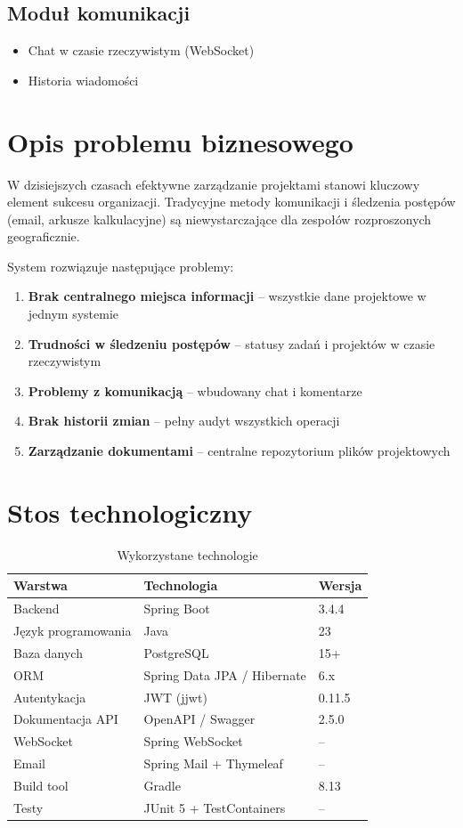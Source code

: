 \documentclass[12pt,a4paper]{report}
\begin{document}
\subsection{Moduł komunikacji}
\begin{itemize}
    \item Chat w czasie rzeczywistym (WebSocket)
    \item Historia wiadomości
\end{itemize}

\section{Opis problemu biznesowego}

W dzisiejszych czasach efektywne zarządzanie projektami stanowi kluczowy element sukcesu organizacji. Tradycyjne metody komunikacji i śledzenia postępów (email, arkusze kalkulacyjne) są niewystarczające dla zespołów rozproszonych geograficznie.

System rozwiązuje następujące problemy:
\begin{enumerate}
    \item \textbf{Brak centralnego miejsca informacji} -- wszystkie dane projektowe w jednym systemie
    \item \textbf{Trudności w śledzeniu postępów} -- statusy zadań i projektów w czasie rzeczywistym
    \item \textbf{Problemy z komunikacją} -- wbudowany chat i komentarze
    \item \textbf{Brak historii zmian} -- pełny audyt wszystkich operacji
    \item \textbf{Zarządzanie dokumentami} -- centralne repozytorium plików projektowych
\end{enumerate}

\section{Stos technologiczny}

\begin{table}[H]
\centering
\caption{Wykorzystane technologie}
\begin{tabular}{|l|l|l|}
\hline
\textbf{Warstwa} & \textbf{Technologia} & \textbf{Wersja} \\
\hline
Backend & Spring Boot & 3.4.4 \\
Język programowania & Java & 23 \\
Baza danych & PostgreSQL & 15+ \\
ORM & Spring Data JPA / Hibernate & 6.x \\
Autentykacja & JWT (jjwt) & 0.11.5 \\
Dokumentacja API & OpenAPI / Swagger & 2.5.0 \\
WebSocket & Spring WebSocket & -- \\
Email & Spring Mail + Thymeleaf & -- \\
Build tool & Gradle & 8.13 \\
Testy & JUnit 5 + TestContainers & -- \\
\hline
\end{tabular}
\end{table}
\end{document}
